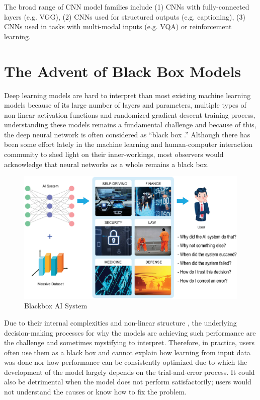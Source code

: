 The broad range of CNN model families include (1) CNNs with fully-connected layers (e.g. VGG), (2) CNNs used for structured outputs (e.g. captioning), (3) CNNs used in tasks with multi-modal inputs (e.g. VQA) or reinforcement learning.

\section{The Advent of Black Box Models}

Deep learning models are hard to interpret than most existing machine learning models \cite{Kahng2018} because of its large number of layers and parameters, multiple types of non-linear activation functions and randomized gradient descent training process, understanding these models remains a fundamental challenge and because of this, the deep neural network is often considered as “black box \cite{dlvwz}.” Although there has been some effort lately in the machine learning and human-computer interaction community to shed light on their inner-workings, most observers would acknowledge that neural networks as a whole remains a black box.

\begin{figure}[htbp]
\centering
\includegraphics[width=1\textwidth]{images/Blackbox-AI-copy.eps}
\caption{Blackbox AI System}
\label{fig:Blackbox AI system}
\end{figure}

Due to their internal complexities and non-linear structure \cite{Samek}, the underlying decision-making processes for why the models are achieving such performance are the challenge and sometimes mystifying to interpret. Therefore, in practice, users often use them as a black box and cannot explain how learning from input data was done nor how performance can be consistently optimized due to which the development of the model largely depends on the trial-and-error process. It could also be detrimental when the model does not perform satisfactorily; users would not understand the causes or know how to fix the problem. 

